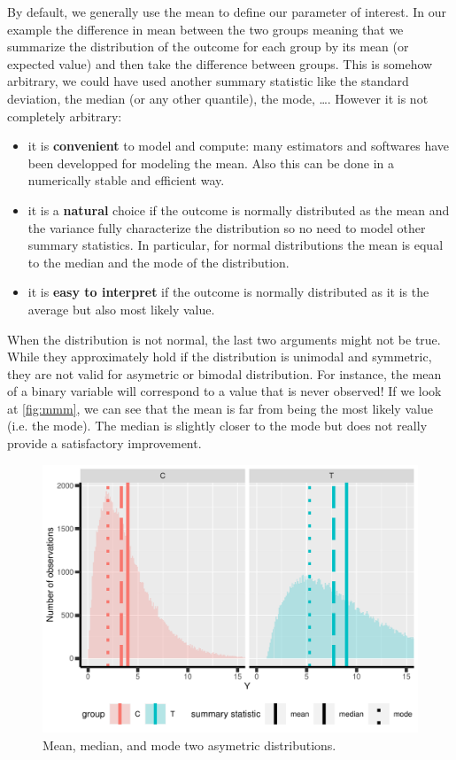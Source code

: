 \documentclass[12pt]{article}
\begin{document}
By default, we generally use the mean to define our parameter of
interest. In our example the difference in mean between the two groups
meaning that we summarize the distribution of the outcome for each
group by its mean (or expected value) and then take the difference
between groups. This is somehow arbitrary, we could have used another
summary statistic like the standard deviation, the median (or any
other quantile), the mode, \ldots. However it is not completely arbitrary:
\begin{itemize}
\item it is \textbf{convenient} to model and compute: many estimators and softwares
have been developped for modeling the mean. Also this can be done
in a numerically stable and efficient way.
\item it is a \textbf{natural} choice if the outcome is normally distributed as
the mean and the variance fully characterize the distribution so no
need to model other summary statistics. In particular, for normal
distributions the mean is equal to the median and the mode of the
distribution.
\item it is \textbf{easy to interpret} if the outcome is normally distributed as
it is the average but also most likely value.
\end{itemize}

When the distribution is not normal, the last two arguments might not
be true. While they approximately hold if the distribution is unimodal
and symmetric, they are not valid for asymetric or bimodal
distribution. For instance, the mean of a binary variable will
correspond to a value that is never observed! If we look at
\autoref{fig:mmm}, we can see that the mean is far from being the most
likely value (i.e. the mode). The median is slightly closer to the
mode but does not really provide a satisfactory improvement. 

\clearpage

\begin{figure}[!h]
\centering
\includegraphics[width=\textwidth]{./figures/meanMedianMode.pdf}
\caption{\label{fig:mmm}Mean, median, and mode two asymetric distributions.}
\end{figure}
\end{document}
